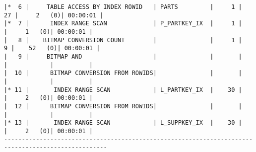 \documentclass[11pt,a4paper,parskip=half]{scrartcl}
\begin{document}
\begin{lstlisting}
|*  6 |     TABLE ACCESS BY INDEX ROWID   | PARTS         |     1 |    27 |     2   (0)| 00:00:01 |                                                                                                                                                                                                          
|*  7 |      INDEX RANGE SCAN             | P_PARTKEY_IX  |     1 |       |     1   (0)| 00:00:01 |                                                                                                                                                                                                          
|   8 |    BITMAP CONVERSION COUNT        |               |     1 |     9 |    52   (0)| 00:00:01 |                                                                                                                                                                                                          
|   9 |     BITMAP AND                    |               |       |       |            |          |                                                                                                                                                                                                          
|  10 |      BITMAP CONVERSION FROM ROWIDS|               |       |       |            |          |                                                                                                                                                                                                          
|* 11 |       INDEX RANGE SCAN            | L_PARTKEY_IX  |    30 |       |     2   (0)| 00:00:01 |                                                                                                                                                                                                          
|  12 |      BITMAP CONVERSION FROM ROWIDS|               |       |       |            |          |                                                                                                                                                                                                          
|* 13 |       INDEX RANGE SCAN            | L_SUPPKEY_IX  |    30 |       |     2   (0)| 00:00:01 |                                                                                                                                                                                                          
---------------------------------------------------------------------------------------------------                                                                                                                                                                                                          
                                                                                                                                                                                                                                                                                                             

\end{lstlisting}
\end{document}
